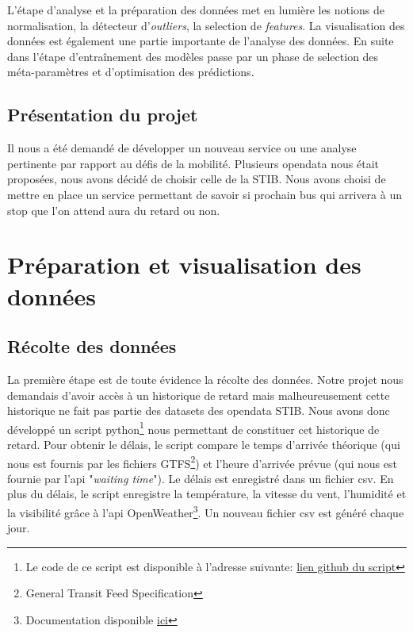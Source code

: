 \documentclass[12pt]{report}
\begin{document}
L'étape d'analyse et la préparation des données met en lumière les notions de normalisation, la détecteur d'\textit{outliers}, la selection de \textit{features}. La visualisation des données est également une partie importante de l'analyse des données. En suite dans l'étape d'entraînement des modèles passe par un phase de selection des méta-paramètres et d'optimisation des prédictions.

\section{Présentation du projet}
Il nous a été demandé de développer un nouveau service ou une analyse pertinente par rapport au défis de la mobilité. Plusieurs opendata nous était proposées, nous avons décidé de choisir celle de la STIB. Nous avons choisi de mettre en place un service permettant de savoir si prochain bus qui arrivera à un stop que l'on attend aura du retard ou non.

\chapter{Préparation et visualisation des données}

\section{Récolte des données}
La première étape est de toute évidence la récolte des données. Notre projet nous demandais d'avoir accès à un historique de retard mais malheureusement cette historique ne fait pas partie des datasets des opendata STIB. Nous avons donc développé un script python\footnote{Le code de ce script est disponible à l'adresse suivante: \href{https://github.com/jalbrecq/CanYouCatchIt/blob/main/sandbox/delay_gathering/delay_gathering.py}{lien github du script}} nous permettant de constituer cet historique de retard. Pour obtenir le délais, le script compare le temps d'arrivée théorique (qui nous est fournis par les fichiers GTFS\footnote{General Transit Feed Specification}) et l'heure d'arrivée prévue (qui nous est fournie par l'api "\textit{waiting time}"). Le délais est enregistré dans un fichier csv. En plus du délais, le script enregistre la température, la vitesse du vent, l'humidité et la visibilité grâce à l'api OpenWeather\footnote{Documentation disponible \href{https://openweathermap.org/}{ici}}. Un nouveau fichier csv est généré chaque jour.
\end{document}
